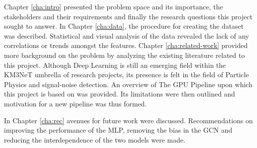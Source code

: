 Chapter \ref{cha:intro} presented the problem space and its
importance, the stakeholders and their requirements and finally the
research questions this project sought to answer. In Chapter
\ref{cha:data}, the procedure for creating the dataset was described.
Statistical and visual analysis of the data revealed the lack of any
correlations or trends amongst the features. Chapter
\ref{cha:related-work} provided more background on the problem by
analyzing the existing literature related to this project. Although
Deep Learning is still an emerging field within the KM3NeT umbrella of
research projects, its presence is felt in the field of Particle
Physics and signal-noise detection. An overview of The GPU Pipeline
upon which this project is based on was provided. Its limitations
were then outlined and motivation for a new pipeline was thus formed.

In Chapter \ref{cha:rec} avenues for future work were discussed.
Recommendations on improving the performance of the MLP, removing the
bias in the GCN and reducing the interdependence of the two models
were made. 
